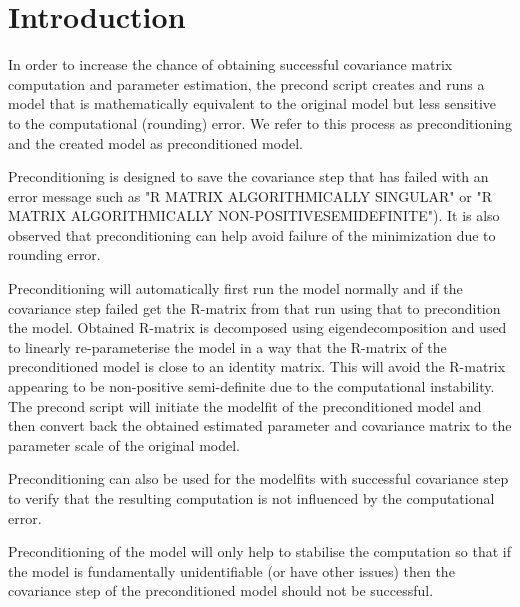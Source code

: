 
\usepackage{color}
\usepackage{amsmath}
\usepackage{tikz}
\usetikzlibrary{shapes,arrows}




\maketitle

\section{Introduction}
In order to increase the chance of obtaining successful covariance matrix computation and parameter estimation, the precond\cite{Page} script creates and runs a model that is mathematically equivalent to the original model but less sensitive to the computational (rounding) error.  We refer to this process as preconditioning and the created model as preconditioned model.

Preconditioning is designed to save the covariance step that has failed with an error message such as "R MATRIX ALGORITHMICALLY SINGULAR" or "R MATRIX ALGORITHMICALLY NON-POSITIVESEMIDEFINITE"). It is also observed that preconditioning can help avoid failure of the minimization due to rounding error.

Preconditioning will automatically first run the model normally and if the covariance step failed get the R-matrix from that run using that to precondition the model. Obtained R-matrix is decomposed using eigendecomposition and used to linearly re-parameterise the model in a way that the R-matrix of the preconditioned model is close to an identity matrix.  This will avoid the R-matrix appearing to be non-positive semi-definite due to the computational instability.  The precond script will initiate the modelfit of the preconditioned model and then convert back the obtained estimated parameter and covariance matrix to the parameter scale of the original model.

Preconditioning can also be used for the modelfits with successful covariance step to verify that the resulting computation is not influenced by the computational error.

Preconditioning of the model will only help to stabilise the computation so that if the model is fundamentally unidentifiable (or have other issues) then the covariance step of the preconditioned model should not be successful.\\



